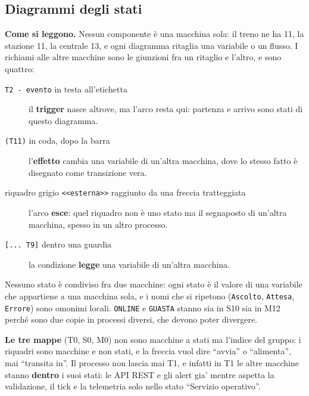 \documentclass[11pt]{article}
\begin{document}
\subsection{Diagrammi degli stati}
\label{sec:org6250c8e}

\textbf{Come si leggono.} Nessun componente è una macchina sola: il treno ne ha 11, la stazione 11, la
centrale 13, e ogni diagramma ritaglia una variabile o un flusso. I richiami alle altre macchine
sono le giunzioni fra un ritaglio e l'altro, e sono quattro:

\begin{description}
\item[{\texttt{T2 - evento} in testa all'etichetta}] il \textbf{trigger} nasce altrove, ma l'arco resta qui: partenza
e arrivo sono stati di questo diagramma.
\item[{\texttt{(T11)} in coda, dopo la barra}] l'\textbf{effetto} cambia una variabile di un'altra macchina, dove lo
stesso fatto è disegnato come transizione vera.
\item[{riquadro grigio \texttt{<{}<{}esterna>{}>{}} raggiunto da una freccia tratteggiata}] l'arco \textbf{esce}: quel
riquadro non è uno stato ma il segnaposto di un'altra macchina, spesso in un altro processo.
\item[{\texttt{[... T9]} dentro una guardia}] la condizione \textbf{legge} una variabile di un'altra macchina.
\end{description}

Nessuno stato è condiviso fra due macchine: ogni stato è il valore di una variabile che appartiene a
una macchina sola, e i nomi che si ripetono (\texttt{Ascolto}, \texttt{Attesa}, \texttt{Errore}) sono omonimi locali.
\texttt{ONLINE} e \texttt{GUASTA} stanno sia in S10 sia in M12 perché sono due copie in processi diversi, che
devono poter divergere.

\textbf{Le tre mappe} (T0, S0, M0) non sono macchine a stati ma l'indice del gruppo: i riquadri sono
macchine e non stati, e la freccia vuol dire ``avvia'' o ``alimenta'', mai ``transita in''. Il processo non
lascia mai T1, e infatti in T1 le altre macchine stanno \textbf{dentro} i suoi stati: le API REST e gli alert
gia' mentre aspetta la validazione, il tick e la telemetria solo nello stato ``Servizio operativo''.
\end{document}
